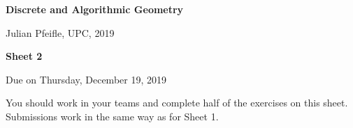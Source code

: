\documentclass[11pt]{amsart}
\begin{document}
\DefineShortVerb{\·}

\begin{center}
\textbf{\sffamily
   Discrete and Algorithmic Geometry }

\medskip
   Julian Pfeifle,
   UPC, 2019
\end{center}

\medskip

\begin{center}
  \textbf{\sffamily Sheet 2}

  \bigskip
Due on Thursday, December 19, 2019
\end{center}

\bigskip

You should work in your teams and complete half of the exercises on this sheet.
Submissions work in the same way as for Sheet 1.
\end{document}
